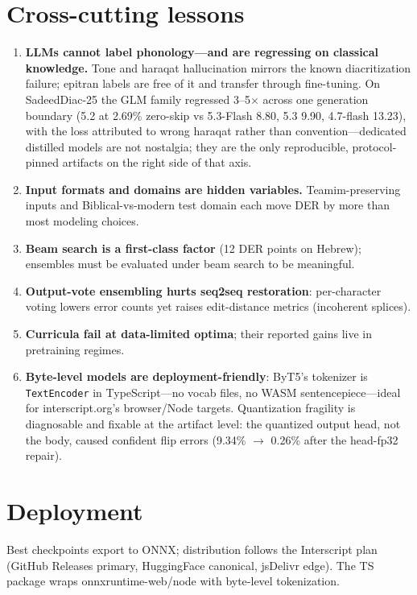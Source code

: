 \documentclass[11pt]{article}
\begin{document}
\section{Cross-cutting lessons}
\begin{enumerate}
  \item \textbf{LLMs cannot label phonology---and are regressing on
        classical knowledge.} Tone and haraqat hallucination mirrors
        the known diacritization failure; epitran labels are free of
        it and transfer through fine-tuning. On SadeedDiac-25 the GLM
        family regressed 3--5$\times$ across one generation boundary
        (5.2 at 2.69\% zero-skip vs 5.3-Flash 8.80, 5.3 9.90,
        4.7-flash 13.23), with the loss attributed to wrong haraqat
        rather than convention---dedicated distilled models are not
        nostalgia; they are the only reproducible, protocol-pinned
        artifacts on the right side of that axis.
  \item \textbf{Input formats and domains are hidden variables.}
        Teamim-preserving inputs and Biblical-vs-modern test domain each
        move DER by more than most modeling choices.
  \item \textbf{Beam search is a first-class factor} (12 DER points on
        Hebrew); ensembles must be evaluated under beam search to be
        meaningful.
  \item \textbf{Output-vote ensembling hurts seq2seq restoration}:
        per-character voting lowers error counts yet raises
        edit-distance metrics (incoherent splices).
  \item \textbf{Curricula fail at data-limited optima}; their reported
        gains live in pretraining regimes.
  \item \textbf{Byte-level models are deployment-friendly}: ByT5's
        tokenizer is \texttt{TextEncoder} in TypeScript---no vocab
        files, no WASM sentencepiece---ideal for interscript.org's
        browser/Node targets. Quantization fragility is diagnosable
        and fixable at the artifact level: the quantized output head,
        not the body, caused confident flip errors (9.34\% $\to$
        0.26\% after the head-fp32 repair).
\end{enumerate}

\section{Deployment}
Best checkpoints export to ONNX; distribution follows the Interscript
plan (GitHub Releases primary, HuggingFace canonical, jsDelivr edge).
The TS package wraps onnxruntime-web/node with byte-level tokenization.
\end{document}
